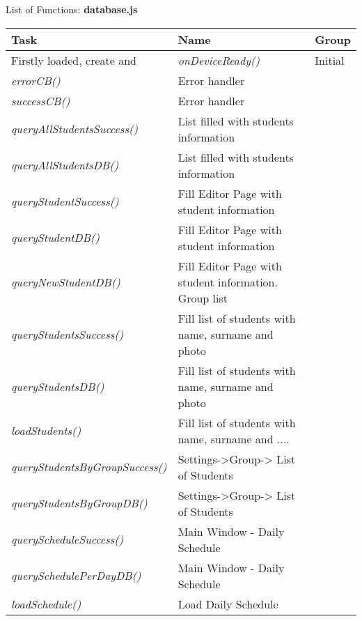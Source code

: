 \begin{bclogo}[couleur=orange!30,logo=\bcbook, arrondi=0.1,ombre=true ] 
{List of Functions: {\bf database.js}}	
\begin{tabular}{lll}
Task                    & Name            & Group \\
\hline
Firstly loaded, create and    & \emph{ onDeviceReady()  }& Initial\\
\emph{ errorCB() }                         & Error handler \\
\emph{  successCB()            }           &  Error handler \\
\emph { queryAllStudentsSuccess()}         & List filled with students information \\
\emph { queryAllStudentsDB() }             & List filled with students information \\
\emph { queryStudentSuccess() }            & Fill Editor Page with student information \\
\emph { queryStudentDB() }                 & Fill Editor Page with student information \\
\emph { queryNewStudentDB() }              & Fill Editor Page with student information. Group list \\
\emph { queryStudentsSuccess() }           & Fill list of students with name, surname and photo  \\
\emph { queryStudentsDB() }                & Fill list of students with name, surname and photo  \\
\emph { loadStudents()  }                  & Fill list of students with name, surname and  .... \\
\emph { queryStudentsByGroupSuccess() }     & Settings->Group-> List of Students \\
\emph { queryStudentsByGroupDB() }          & Settings->Group-> List of Students \\
\emph { queryScheduleSuccess() }          & Main Window - Daily Schedule \\
\emph { querySchedulePerDayDB() }         & Main Window - Daily Schedule \\
\emph { loadSchedule() }       & { Load Daily Schedule } \\


\end{tabular}
\end{bclogo}

